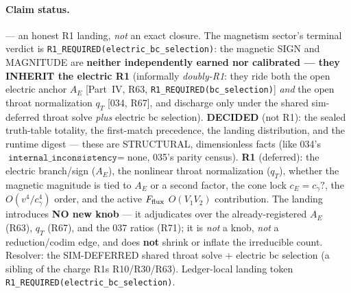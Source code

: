 
\paragraph{Claim status.}
\StatusOpen{} --- an honest R1 landing, \emph{not} an exact closure. The
magnetism sector's terminal verdict is
\texttt{R1\_REQUIRED(electric\_bc\_selection)}: the magnetic SIGN and
MAGNITUDE are \textbf{neither independently earned nor calibrated --- they
INHERIT the electric R1} (informally \emph{doubly-R1}: they ride both the
open electric anchor \(A_E\) [Part~IV, R63,
\texttt{R1\_REQUIRED(bc\_selection)}] \emph{and} the open throat
normalization \(q_T\) [034, R67], and discharge only under the shared
sim-deferred throat solve \emph{plus} electric bc selection). \textbf{DECIDED}
(not R1): the sealed truth-table totality, the first-match precedence, the
landing distribution, and the runtime digest --- these are STRUCTURAL,
dimensionless facts (like 034's \(\texttt{internal\_inconsistency}=\)none,
035's parity census). \textbf{R1} (deferred): the electric branch/sign
(\(A_E\)), the nonlinear throat normalization (\(q_T\)), whether the magnetic
magnitude is tied to \(A_E\) or a second factor, the cone lock
\(c_E{=}c_\gamma?\), the \(O(v^4/c_\gamma^4)\) order, and the active
\(F_{\rm flux}\) \(O(V_1V_2)\) contribution. The landing introduces \textbf{NO
new knob} --- it adjudicates over the already-registered \(A_E\) (R63),
\(q_T\) (R67), and the 037 ratios (R71); it is \emph{not} a knob, \emph{not} a
reduction/codim edge, and does \textbf{not} shrink or inflate the irreducible
count. Resolver: the SIM-DEFERRED shared throat solve + electric bc selection
(a sibling of the charge R1s R10/R30/R63). Ledger-local landing token
\texttt{R1\_REQUIRED(electric\_bc\_selection)}.

